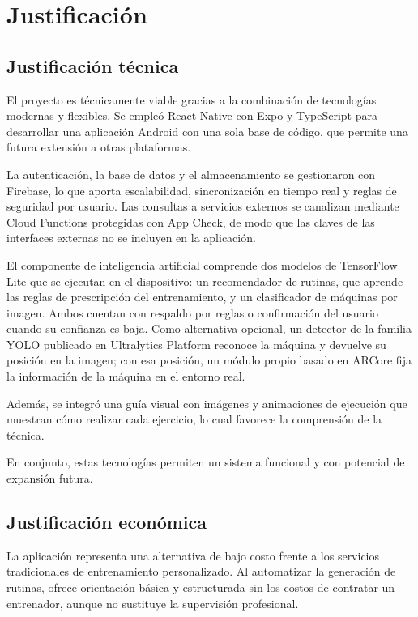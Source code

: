 \section{Justificación}
\label{sec:justificacion}

\subsection{Justificación técnica}

El proyecto es técnicamente viable gracias a la combinación de tecnologías
modernas y flexibles. Se empleó React Native con Expo y TypeScript para
desarrollar una aplicación Android con una sola base de código, que permite
una futura extensión a otras plataformas.

La autenticación, la base de datos y el almacenamiento se gestionaron con
Firebase, lo que aporta escalabilidad, sincronización en tiempo real y reglas de
seguridad por usuario. Las consultas a servicios externos se canalizan mediante
Cloud Functions protegidas con App Check, de modo que las claves de las
interfaces externas no se incluyen en la aplicación.

El componente de inteligencia artificial comprende dos modelos de TensorFlow
Lite que se ejecutan en el dispositivo: un recomendador de rutinas, que aprende
las reglas de prescripción del entrenamiento, y un clasificador de máquinas por
imagen. Ambos cuentan con respaldo por reglas o confirmación del usuario cuando
su confianza es baja. Como alternativa opcional, un detector de la familia
YOLO publicado en Ultralytics Platform reconoce la máquina y devuelve su
posición en la imagen; con esa posición, un módulo propio basado en ARCore fija
la información de la máquina en el entorno real.

Además, se integró una guía visual con imágenes y animaciones de ejecución que
muestran cómo realizar cada ejercicio, lo cual favorece la comprensión de la
técnica.

En conjunto, estas tecnologías permiten un sistema funcional y con potencial de
expansión futura.

\subsection{Justificación económica}

La aplicación representa una alternativa de bajo costo frente a los servicios
tradicionales de entrenamiento personalizado. Al automatizar la generación de
rutinas, ofrece orientación básica y estructurada sin los costos de contratar
un entrenador, aunque no sustituye la supervisión profesional.


